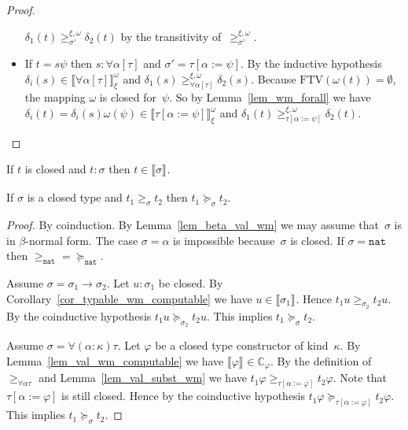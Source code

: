 \documentclass[a4paper,UKenglish,cleveref,autoref,numberwithinsect]{lipics-v2019}
\theoremstyle{definition}
\newcommand{\arrtype}{\rightarrow}
\newcommand{\subst}[2]{#1:=#2}
\newcommand{\nat}{\mathtt{nat}}
\newcommand{\FTV}{\mathrm{FTV}}
\newcommand{\Cb}{\mathbb{C}}
\newcommand{\val}[3]{\ensuremath{\llbracket#1\rrbracket_{#2}^{#3}}}
\newcommand{\gteq}[3]{\ensuremath{\ge_{#1}^{#2,#3}}}
\begin{document}
\begin{proof}
\begin{itemize}
    $\delta_1(t)\gteq{\sigma'}{\xi}{\omega}\delta_2(t)$ by the
    transitivity of~$\gteq{\sigma'}{\xi}{\omega}$.
  \item If $t = s \psi$ then $s : \forall\alpha[\tau]$ and $\sigma' =
    \tau[\subst{\alpha}{\psi}]$. By the inductive hypothesis
    $\delta_i(s) \in \val{\forall\alpha[\tau]}{\xi}{\omega}$ and
    $\delta_1(s) \gteq{\forall\alpha[\tau]}{\xi}{\omega}
    \delta_2(s)$. Because $\FTV(\omega(t)) = \emptyset$, the mapping
    $\omega$ is closed for~$\psi$. So by Lemma~\ref{lem_wm_forall} we
    have $\delta_i(t) = \delta_i(s) \omega(\psi) \in
    \val{\tau[\subst{\alpha}{\psi}]}{\xi}{\omega}$ and $\delta_1(t)
    \gteq{\tau[\subst{\alpha}{\psi}]}{\xi}{\omega} \delta_2(t)$.\qedhere
  \end{itemize}
\end{proof}

\begin{corollary}\label{cor_typable_wm_computable}
  If $t$ is closed and $t : \sigma$ then $t \in \val{\sigma}{}{}$.
\end{corollary}

\begin{lemma}\label{lem_gteq_to_succeq}
  If $\sigma$ is a closed type and $t_1 \geq_\sigma t_2$ then
  $t_1 \succeq_{\sigma} t_2$.
\end{lemma}

\begin{proof}
  By coinduction. By Lemma~\ref{lem_beta_val_wm} we may assume
  that~$\sigma$ is in $\beta$-normal form. The case $\sigma=\alpha$ is
  impossible because~$\sigma$ is closed. If $\sigma = \nat$ then
  ${\geq_\nat} = {\succeq_\nat}$.

  Assume $\sigma=\sigma_1\arrtype\sigma_2$. Let $u : \sigma_1$ be
  closed. By Corollary~\ref{cor_typable_wm_computable} we have $u \in
  \val{\sigma_1}{}{}$. Hence $t_1 u \geq_{\sigma_2} t_2 u$. By the
  coinductive hypothesis $t_1 u \succeq_{\sigma_2} t_2 u$. This
  implies $t_1 \succeq_{\sigma} t_2$.

  Assume $\sigma=\forall(\alpha:\kappa)\tau$. Let $\varphi$ be a
  closed type constructor of kind~$\kappa$. By
  Lemma~\ref{lem_val_wm_computable} we have $\val{\varphi}{}{} \in
  \Cb_\varphi$. By the definition of~$\geq_{\forall\alpha\tau}$ and
  Lemma~\ref{lem_val_subst_wm} we have $t_1 \varphi
  \geq_{\tau[\subst{\alpha}{\varphi}]} t_2 \varphi$. Note that
  $\tau[\subst{\alpha}{\varphi}]$ is still closed. Hence by the
  coinductive hypothesis $t_1 \varphi
  \succeq_{\tau[\subst{\alpha}{\varphi}]} t_2 \varphi$. This implies
  $t_1 \succeq_{\sigma} t_2$.
\end{proof}
\end{document}
